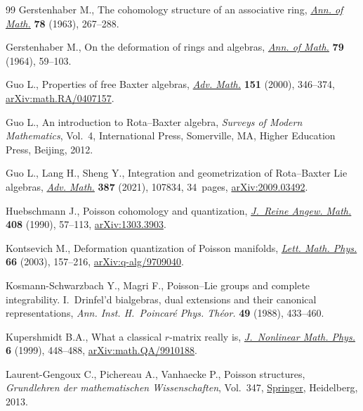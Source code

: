 \documentclass[pdftex]{sigma}%
\numberwithin{equation}{section}
\begin{document}
\begin{thebibliography}{99}
Gerstenhaber M., The cohomology structure of an associative ring, \href{https://doi.org/10.2307/1970343}{\textit{Ann.
 of Math.}} \textbf{78} (1963), 267--288.

Gerstenhaber M., On the deformation of rings and algebras, \href{https://doi.org/10.2307/1970484}{\textit{Ann. of
 Math.}} \textbf{79} (1964), 59--103.

Guo L., Properties of free {B}axter algebras, \href{https://doi.org/10.1006/aima.1999.1898}{\textit{Adv. Math.}} \textbf{151}
 (2000), 346--374, \href{https://arxiv.org/abs/math.RA/0407157}{arXiv:math.RA/0407157}.

Guo L., An introduction to {R}ota--{B}axter algebra, \textit{Surveys of Modern
 Mathematics}, Vol.~4, International Press, Somerville, MA, Higher Education
 Press, Beijing, 2012.

Guo L., Lang H., Sheng Y., Integration and geometrization of {R}ota--{B}axter
 {L}ie algebras, \href{https://doi.org/10.1016/j.aim.2021.107834}{\textit{Adv. Math.}} \textbf{387} (2021), 107834, 34~pages,
 \href{https://arxiv.org/abs/2009.03492}{arXiv:2009.03492}.

Huebschmann J., Poisson cohomology and quantization, \href{https://doi.org/10.1515/crll.1990.408.57}{\textit{J.~Reine Angew.
 Math.}} \textbf{408} (1990), 57--113, \href{https://arxiv.org/abs/1303.3903}{arXiv:1303.3903}.

Kontsevich M., Deformation quantization of {P}oisson manifolds, \href{https://doi.org/10.1023/B:MATH.0000027508.00421.bf}{\textit{Lett.
 Math. Phys.}} \textbf{66} (2003), 157--216, \href{https://arxiv.org/abs/q-alg/9709040}{arXiv:q-alg/9709040}.

Kosmann-Schwarzbach Y., Magri F., Poisson--{L}ie groups and complete
 integrability. {I}.~{D}rinfel'd bialgebras, dual extensions and their
 canonical representations, \textit{Ann. Inst. H.~Poincar\'e Phys. Th\'eor.}
 \textbf{49} (1988), 433--460.

Kupershmidt B.A., What a classical {$r$}-matrix really is, \href{https://doi.org/10.2991/jnmp.1999.6.4.5}{\textit{J.~Nonlinear
 Math. Phys.}} \textbf{6} (1999), 448--488, \href{https://arxiv.org/abs/math.QA/9910188}{arXiv:math.QA/9910188}.

Laurent-Gengoux C., Pichereau A., Vanhaecke P., Poisson structures,
 \textit{Grundlehren der mathematischen Wissenschaften}, Vol.~347, \href{https://doi.org/10.1007/978-3-642-31090-4}{Springer},
 Heidelberg, 2013.


\end{thebibliography}
\end{document}
